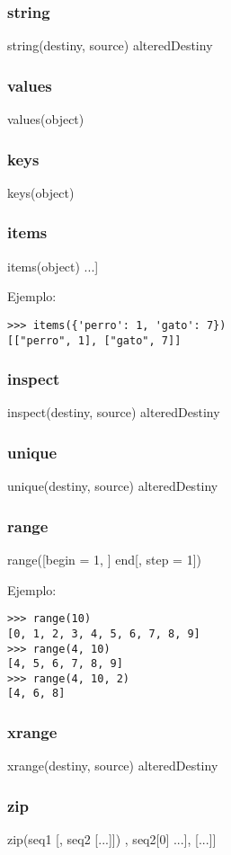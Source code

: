 \subsubsection*{string}
string(destiny, source) \rightarrow alteredDestiny
\subsubsection*{values}
values(object) \rightarrow [value...]
\subsubsection*{keys}
keys(object) \rightarrow [key...]
\subsubsection*{items}
items(object) \rightarrow [[key, value]...]

\noindent
Ejemplo:
\begin{lstlisting}[style=consola]
>>> items({'perro': 1, 'gato': 7})
[["perro", 1], ["gato", 7]]
\end{lstlisting}
\subsubsection*{inspect}
inspect(destiny, source) \rightarrow alteredDestiny
\subsubsection*{unique}
unique(destiny, source) \rightarrow alteredDestiny
\subsubsection*{range}
range([begin = 1, ] end[, step = 1]) \rightarrow [number...]

\noindent
Ejemplo:
\begin{lstlisting}[style=consola]
>>> range(10)
[0, 1, 2, 3, 4, 5, 6, 7, 8, 9]
>>> range(4, 10)
[4, 5, 6, 7, 8, 9]
>>> range(4, 10, 2)
[4, 6, 8]
\end{lstlisting}

\subsubsection*{xrange}
xrange(destiny, source) \rightarrow alteredDestiny
\subsubsection*{zip}
zip(seq1 [, seq2 [...]]) \rightarrow [[seq1[0], seq2[0] ...], [...]]

